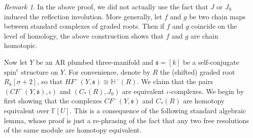 \documentclass[11 pt]{amsart}
\theoremstyle{remark}
\newtheorem {remark}[theorem]{Remark}
\def\spinc {{\operatorname{spin^c}}}
\def\s{\mathfrak s}
\def\ff {{\mathbb{F}}}
\def\He{\mathbb{H}}
\def\CF {\mathit{CF}}
\def\HF {\mathit{HF}}
\newcommand \CFm {\CF^-}
\newcommand \HFm {\HF^-}
\def\inv{\iota}
\begin{document}
\begin{remark}
In the above proof, we did not actually use the fact that $J$ or $J_0$ induced the reflection involution. More generally, let $f$ and $g$ be two chain maps between standard complexes of graded roots. Then if $f$ and $g$ coincide on the level of homology, the above construction shows that $f$ and $g$ are chain homotopic. 
\end{remark}


Now let $Y$ be an AR plumbed three-manifold and $\s = [k]$ be a self-conjugate $\spinc$ structure on $Y$. For convenience, denote by $R$ the (shifted) graded root $R_k[\sigma+2]$, so that $\HFm(Y, \s) \cong \He^-(R)$. We claim that the pairs $(\CFm(Y, \s), \inv)$ and $(C_*(R), J_0)$ are equivalent $\inv$-complexes. We begin by first showing that the complexes $\CFm(Y, \s)$ and $C_*(R)$ are homotopy equivalent over $\ff[U]$. This is a consequence of the following standard algebraic lemma, whose proof is just a re-phrasing of the fact that any two free resolutions of the same module are homotopy equivalent.
\end{document}
